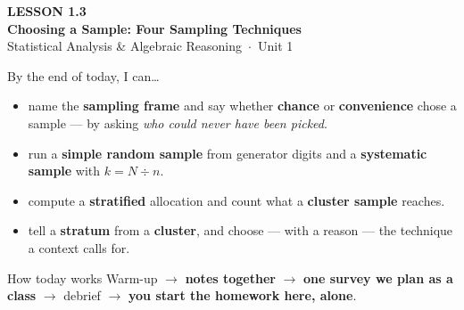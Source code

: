 \documentclass[aspectratio=169, 11pt]{beamer}
\begin{document}
{
\begin{frame}[plain]
  \vspace{2.8cm}\hspace{0.55cm}%
  \begin{minipage}{0.9\textwidth}
    {\color{goldacc}\bfseries\small LESSON 1.3}\\[0.5cm]
    {\color{white}\bfseries\LARGE Choosing a Sample: Four Sampling Techniques}\\[1.2cm]
    {\color{frostmid}\small Statistical Analysis \& Algebraic Reasoning~$\cdot$~Unit 1}
  \end{minipage}
\end{frame}
}

\begin{frame}[t, plain]
  By the end of today, I can\ldots
  \begin{itemize}\setlength{\itemsep}{5pt}
    \item name the \textbf{sampling frame} and say whether \textbf{chance} or
          \textbf{convenience} chose a sample --- by asking \emph{who could never have been picked}.
    \item run a \textbf{simple random sample} from generator digits and a \textbf{systematic
          sample} with $k = N \div n$.
    \item compute a \textbf{stratified} allocation and count what a \textbf{cluster sample} reaches.
    \item tell a \textbf{stratum} from a \textbf{cluster}, and choose --- with a reason --- the
          technique a context calls for.
  \end{itemize}
  \begin{block}{How today works}
    Warm-up $\to$ \textbf{notes together} $\to$ \textbf{one survey we plan as a class} $\to$
    debrief $\to$ \textbf{you start the homework here, alone}.
  \end{block}
\end{frame}
\end{document}
